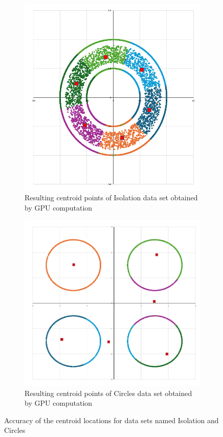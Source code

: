 \documentclass{article}
\begin{document}
\begin{figure}[htb]
    \centering
    \begin{subfigure}[b]{0.45\textwidth}
        \centering
        \includegraphics[width=\textwidth]{Isolation.PNG}
        \caption{Resulting centroid points of Isolation data set obtained by GPU computation}
        \label{fig:image3}
    \end{subfigure}
    \hfill
    \begin{subfigure}[b]{0.50\textwidth}
        \centering
        \includegraphics[width=\textwidth]{Circles.PNG}
        \caption{Resulting centroid points of Circles data set obtained by GPU computation}
        \label{fig:image4}
    \end{subfigure}
    \caption{Accuracy of the centroid locations for data sets named Isolation and Circles}
    \label{fig:sidebyside2}
\end{figure}
\end{document}
